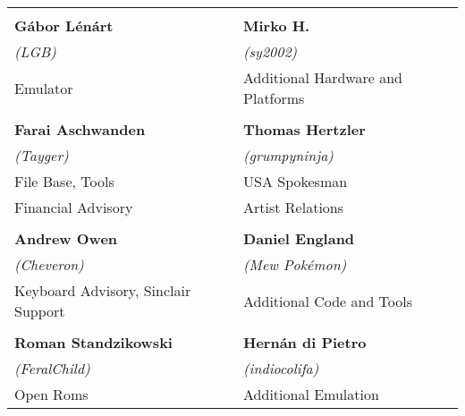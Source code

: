 \begin{tabular}{ll}
& \\
{\large\bf Gábor Lénárt}                & {\large\bf Mirko H.} \\
 \textit{(LGB)}                         & \textit{(sy2002)} \\
Emulator                                & Additional Hardware and Platforms \\
& \\
{\large\bf Farai Aschwanden}            & {\large\bf Thomas Hertzler} \\
 \textit{(Tayger)}                      & \textit{(grumpyninja)} \\
File Base, Tools                        & USA Spokesman \\
Financial Advisory                      & Artist Relations \\
& \\
{\large\bf Andrew Owen}                 & {\large\bf Daniel England} \\
 \textit{(Cheveron)}                    & \textit{(Mew Pokémon)} \\
Keyboard Advisory, Sinclair Support     & Additional Code and Tools \\
& \\
{\large\bf Roman Standzikowski}         & {\large\bf Hernán di Pietro} \\
 \textit{(FeralChild)}                  & \textit{(indiocolifa)} \\
Open Roms                               & Additional Emulation \\
\end{tabular}

